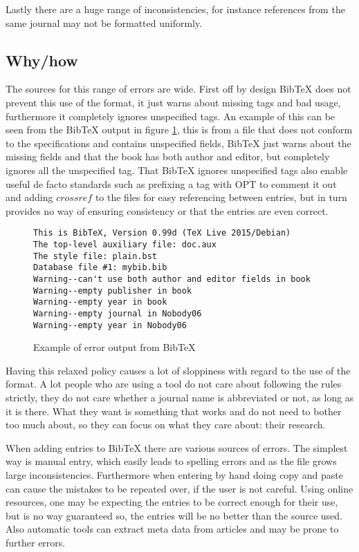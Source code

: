 Lastly there are a huge range of inconsistencies, for instance
references from the same journal may not be formatted uniformly.

\subsection{Why/how }
The sources for this range of errors are wide.  First off by design
Bib{\TeX} does not prevent this use of the format, it just warns about
missing tags and bad usage, furthermore it completely ignores
unspecified tags.  An example of this can be seen from the Bib{\TeX}
output in figure \ref{fig:bibtex_out}, this is from a file that does
not conform to the specifications and contains unspecified fields,
Bib{\TeX} just warns about the missing fields and that the book has
both author and editor, but completely ignores all the unspecified
tag.  That Bib{\TeX} ignores unspecified tags also enable useful de
facto standards such as prefixing a tag with OPT to comment it out and
adding $crossref$ to the files for easy referencing between entries,
but in turn provides no way of ensuring consistency or that the
entries are even correct.

\begin{figure}[h]
  \centering
  \begin{verbatim}
This is BibTeX, Version 0.99d (TeX Live 2015/Debian)
The top-level auxiliary file: doc.aux
The style file: plain.bst
Database file #1: mybib.bib
Warning--can't use both author and editor fields in book
Warning--empty publisher in book
Warning--empty year in book
Warning--empty journal in Nobody06
Warning--empty year in Nobody06
\end{verbatim}
  \caption{Example of error output from Bib{\TeX}}
  \label{fig:bibtex_out}
\end{figure}

Having this relaxed policy causes a lot of sloppiness with regard to
the use of the format.  A lot people who are using a tool do not care
about following the rules strictly, they do not care whether a journal
name is abbreviated or not, as long as it is there. What they want is
something that works and do not need to bother too much about, so they
can focus on what they care about: their research.

When adding entries to Bib{\TeX} there are various sources of errors.
The simplest way is manual entry, which easily leads to spelling
errors and as the file grows large inconsistencies.  Furthermore when
entering by hand doing copy and paste can cause the mistakes to be
repeated over, if the user is not careful.  Using online resources,
one may be expecting the entries to be correct enough for their use,
but is no way guaranteed so, the entries will be no better than the
source used.  Also automatic tools can extract meta data from articles
and may be prone to further errors.

